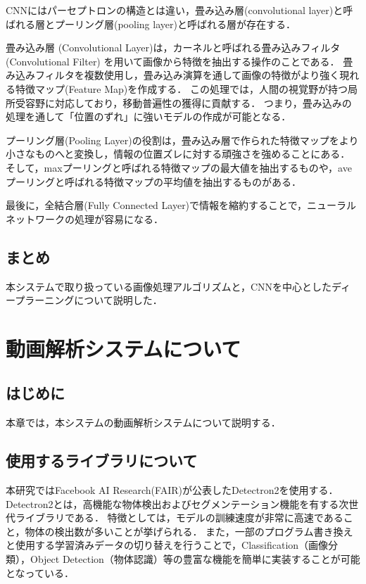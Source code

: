 \documentclass[a4j,12pt,dvipdfmx]{jreport}
\begin{document}
CNNにはパーセプトロンの構造とは違い，畳み込み層(convolutional layer)と呼ばれる層とプーリング層(pooling layer)と呼ばれる層が存在する．

畳み込み層 (Convolutional Layer)は，カーネルと呼ばれる畳み込みフィルタ (Convolutional Filter) を用いて画像から特徴を抽出する操作のことである．
畳み込みフィルタを複数使用し，畳み込み演算を通して画像の特徴がより強く現れる特徴マップ(Feature Map)を作成する．
この処理では，人間の視覚野が持つ局所受容野に対応しており，移動普遍性の獲得に貢献する．
つまり，畳み込みの処理を通して「位置のずれ」に強いモデルの作成が可能となる．

プーリング層(Pooling Layer)の役割は，畳み込み層で作られた特徴マップをより小さなものへと変換し，情報の位置ズレに対する頑強さを強めることにある．
そして，maxプーリングと呼ばれる特徴マップの最大値を抽出するものや，aveプーリングと呼ばれる特徴マップの平均値を抽出するものがある．

最後に，全結合層(Fully Connected Layer)で情報を縮約することで，ニューラルネットワークの処理が容易になる．

\section{まとめ}
本システムで取り扱っている画像処理アルゴリズムと，CNNを中心としたディープラーニングについて説明した．
\clearpage
\chapter{動画解析システムについて}
\label{sec:system}

\section{はじめに}
\label{chap3-1}
本章では，本システムの動画解析システムについて説明する．

\section{使用するライブラリについて}
\label{chap3-2}
本研究ではFacebook AI Research(FAIR)が公表したDetectron2を使用する．
Detectron2とは，高機能な物体検出およびセグメンテーション機能を有する次世代ライブラリである\cite{detectron2}．
特徴としては，モデルの訓練速度が非常に高速であること，物体の検出数が多いことが挙げられる．
また，一部のプログラム書き換えと使用する学習済みデータの切り替えを行うことで，Classification（画像分類），Object Detection（物体認識）等の豊富な機能を簡単に実装することが可能となっている．
\end{document}

